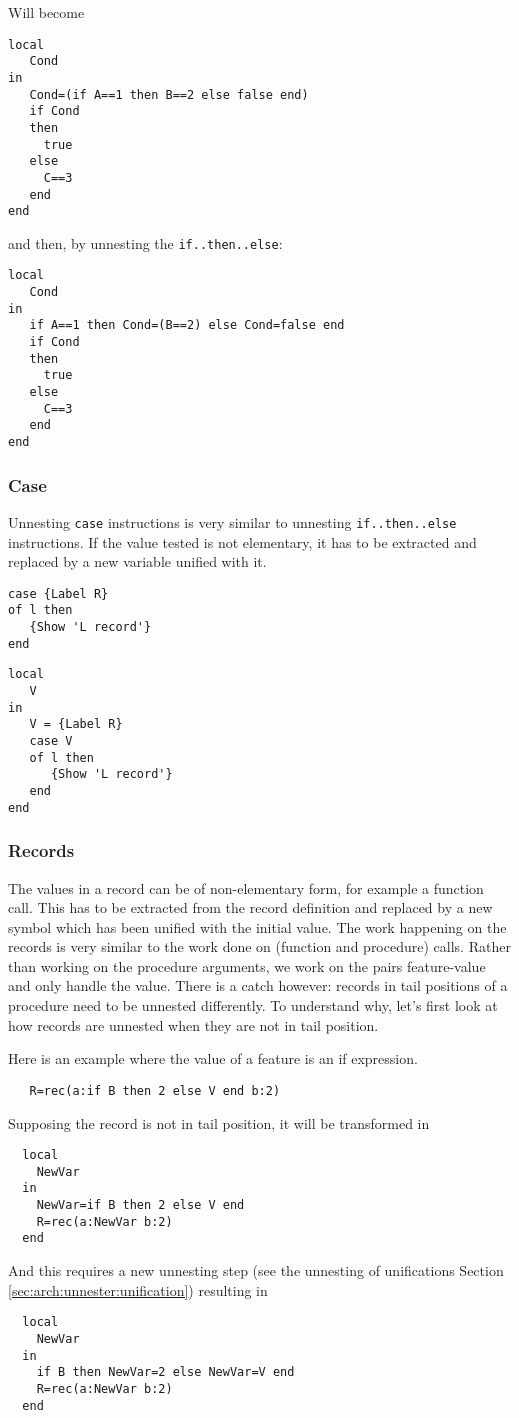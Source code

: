 \documentclass[a4paper]{memoir}
\begin{document}
Will become

\begin{lstlisting}
local
   Cond
in
   Cond=(if A==1 then B==2 else false end)
   if Cond
   then
     true
   else
     C==3
   end
end
\end{lstlisting}
and then, by unnesting the \lstinline!if..then..else!:
\begin{lstlisting}
local
   Cond
in
   if A==1 then Cond=(B==2) else Cond=false end
   if Cond
   then
     true
   else
     C==3
   end
end
\end{lstlisting}

\subsubsection{Case}
Unnesting \lstinline!case! instructions is very similar to unnesting
\lstinline!if..then..else! instructions. If the value tested is not elementary,
it has to be extracted and replaced by a new variable unified with it.
\begin{lstlisting}
case {Label R}
of l then
   {Show 'L record'}
end
\end{lstlisting}

\begin{lstlisting}
local
   V
in
   V = {Label R}
   case V 
   of l then
      {Show 'L record'}
   end
end
\end{lstlisting}
   

\subsubsection{Records}\label{sec:arch:unnester:records}
The values in a record can be of non-elementary form, for example a function call. This has to be extracted from the record definition and replaced by a new symbol which has been unified with the initial value. The work happening on the records is very similar to the work done on (function and procedure) calls. Rather than working on the procedure arguments, we work on the pairs feature-value and only handle the value. 
There is a catch however: records in tail positions of a procedure need to be unnested
differently. To understand why, let's first look at how records are unnested
when they are not in tail position.

Here is an example where the value of a feature is an if expression.
\begin{lstlisting}
   R=rec(a:if B then 2 else V end b:2)
\end{lstlisting}
Supposing the record is not in tail position, it will be transformed in
\begin{lstlisting}
  local
    NewVar
  in
    NewVar=if B then 2 else V end
    R=rec(a:NewVar b:2)
  end
\end{lstlisting}
And this requires a new unnesting step (see the unnesting of unifications Section \ref{sec:arch:unnester:unification}) resulting in 
\begin{lstlisting}
  local
    NewVar
  in
    if B then NewVar=2 else NewVar=V end
    R=rec(a:NewVar b:2)
  end
\end{lstlisting}
\end{document}
